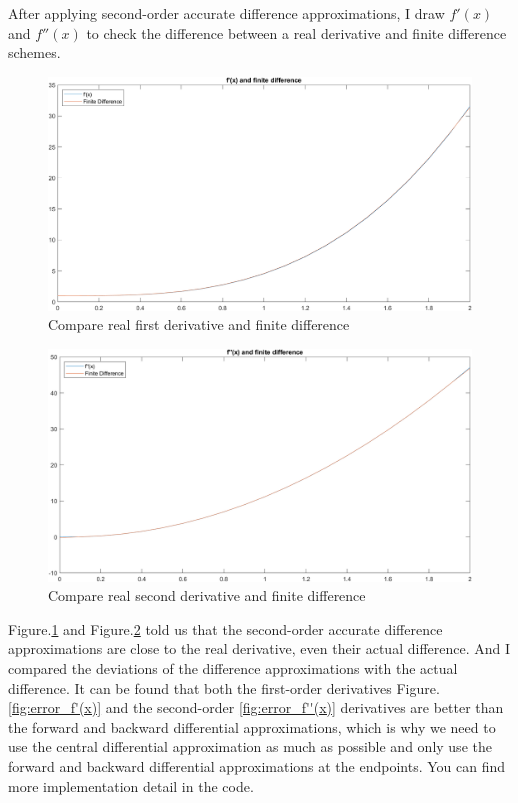 \documentclass[
	12pt, %
]{fphw}
\numberwithin{equation}{section}
\numberwithin{figure}{section}
\numberwithin{table}{section}
\begin{document}
After applying second-order accurate difference approximations, I draw $f'(x)$ and $f''(x)$ to check the difference between a real derivative and finite difference schemes.

\begin{figure}[h!]
	\centering
	\includegraphics[width=0.8\columnwidth]{img/f'(x).png} 
	\caption{Compare real first derivative and finite difference}
	\label{fig:f'(x)}
\end{figure}

\begin{figure}[h!]
	\centering
	\includegraphics[width=0.8\columnwidth]{img/f''(x).png} 
	\caption{Compare real second derivative and finite difference}
	\label{fig:f''(x)}
\end{figure}


Figure.\ref{fig:f'(x)} and Figure.\ref{fig:f''(x)} told us that the second-order accurate difference approximations are close to the real derivative, even their actual difference. 
And I compared the deviations of the difference approximations with the actual difference.
It can be found that both the first-order derivatives Figure.\ref{fig:error_f'(x)} and the second-order \ref{fig:error_f''(x)} derivatives are better than the forward and backward differential approximations, which is why we need to use the central differential approximation as much as possible and only use the forward and backward differential approximations at the endpoints.
You can find more implementation detail in the code.
\end{document}
